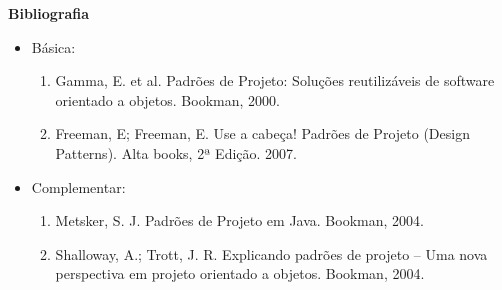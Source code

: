 


\begin{snugshade}\begin{center}\textbf{
    Bibliografia
}\end{center}\end{snugshade}

\begin{itemize} 
  \item Básica:
	\begin{enumerate}
	\item Gamma, E. et al. Padrões de Projeto: Soluções reutilizáveis de software orientado a objetos. Bookman, 2000.
	\item Freeman, E; Freeman, E. Use a cabeça! Padrões de Projeto (Design Patterns). Alta books, 2ª Edição. 2007.      
	\end{enumerate}
  \item Complementar:
	\begin{enumerate} 
	\item Metsker, S. J. Padrões de Projeto em Java. Bookman, 2004.
	\item Shalloway, A.; Trott, J. R. Explicando padrões de projeto – Uma nova perspectiva em projeto orientado a objetos. Bookman, 2004.
	\end{enumerate}
\end{itemize}
